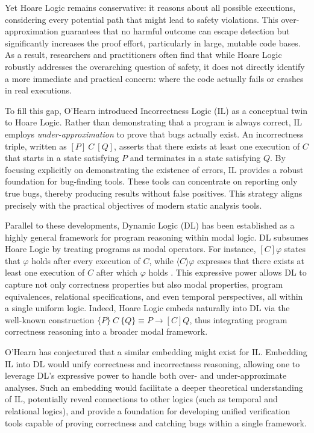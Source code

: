 Yet Hoare Logic remains conservative: it reasons about all possible executions, considering every potential path that might lead to safety violations. This over-approximation guarantees that no harmful outcome can escape detection but significantly increases the proof effort, particularly in large, mutable code bases. As a result, researchers and practitioners often find that while Hoare Logic robustly addresses the overarching question of safety, it does not directly identify a more immediate and practical concern: where the code actually fails or crashes in real executions.

To fill this gap, O’Hearn \cite{ohearnincorrectness2020} introduced Incorrectness Logic (IL) as a conceptual twin to Hoare Logic. Rather than demonstrating that a program is always correct, IL employs \textit{under-approximation} to prove that bugs actually exist. An incorrectness triple, written as $[P]~C~[Q]$, asserts that there exists at least one execution of $C$ that starts in a state satisfying $P$ and terminates in a state satisfying $Q$. By focusing explicitly on demonstrating the existence of errors, IL provides a robust foundation for bug-finding tools. These tools can concentrate on reporting only true bugs, thereby producing results without false positives. This strategy aligns precisely with the practical objectives of modern static analysis tools.

Parallel to these developments, Dynamic Logic (DL) has been established as a highly general framework for program reasoning within modal logic. DL subsumes Hoare Logic by treating programs as modal operators. For instance, $[C]\varphi$ states that $\varphi$ holds after every execution of $C$, while $\langle C \rangle \varphi$ expresses that there exists at least one execution of $C$ after which $\varphi$ holds \cite{harel2001dynamic}. This expressive power allows DL to capture not only correctness properties but also modal properties, program equivalences, relational specifications, and even temporal perspectives, all within a single uniform logic. Indeed, Hoare Logic embeds naturally into DL via the well-known construction $\{P\}~C~\{Q\} \equiv P \rightarrow [C]Q$, thus integrating program correctness reasoning into a broader modal framework.

O’Hearn \cite{ohearnincorrectness2020} has conjectured that a similar embedding might exist for IL. Embedding IL into DL would unify correctness and incorrectness reasoning, allowing one to leverage DL’s expressive power to handle both over- and under-approximate analyses. Such an embedding would facilitate a deeper theoretical understanding of IL, potentially reveal connections to other logics (such as temporal and relational logics), and provide a foundation for developing unified verification tools capable of proving correctness and catching bugs within a single framework.

